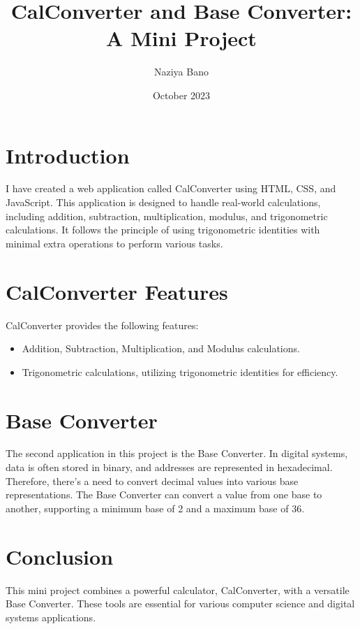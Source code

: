 \documentclass{article}
\title{CalConverter and Base Converter: A Mini Project}
\author{Naziya Bano}
\date{October 2023}
\begin{document}
\maketitle

\section{Introduction}
I have created a web application called CalConverter using HTML, CSS, and JavaScript. This application is designed to handle real-world calculations, including addition, subtraction, multiplication, modulus, and trigonometric calculations. It follows the principle of using trigonometric identities with minimal extra operations to perform various tasks.

\section{CalConverter Features}
CalConverter provides the following features:

\begin{itemize}
    \item Addition, Subtraction, Multiplication, and Modulus calculations.
    \item Trigonometric calculations, utilizing trigonometric identities for efficiency.
\end{itemize}

\section{Base Converter}
The second application in this project is the Base Converter. In digital systems, data is often stored in binary, and addresses are represented in hexadecimal. Therefore, there's a need to convert decimal values into various base representations. The Base Converter can convert a value from one base to another, supporting a minimum base of 2 and a maximum base of 36.

\section{Conclusion}
This mini project combines a powerful calculator, CalConverter, with a versatile Base Converter. These tools are essential for various computer science and digital systems applications.
\end{document}
